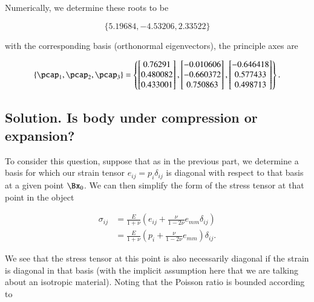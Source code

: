 Numerically, we determine these roots to be

\begin{equation}\label{eqn:continuumProblemSet1:310}
\{5.19684, -4.53206, 2.33522\}
\end{equation}

with the corresponding basis (orthonormal eigenvectors), the principle axes are

\begin{equation}\label{eqn:continuumProblemSet1:330}
\left\{
\pcap_1,
\pcap_2,
\pcap_3
\right\}
=
\left\{
\begin{bmatrix}
0.76291 \\
0.480082 \\
0.433001
\end{bmatrix},
\begin{bmatrix}
-0.010606 \\
-0.660372 \\
0.750863
\end{bmatrix},
\begin{bmatrix}
-0.646418 \\
0.577433 \\
0.498713
\end{bmatrix}
\right\}.
\end{equation}

\subsection{Solution.  Is body under compression or expansion?}

To consider this question, suppose that as in the previous part, we determine a basis for which our strain tensor $e_{ij} = p_i \delta_{ij}$ is diagonal with respect to that basis at a given point $\Bx_0$.  We can then simplify the form of the stress tensor at that point in the object

\begin{align*}
\sigma_{ij}
&=
\frac{E}{1 + \nu} \left(
e_{ij} + \frac{\nu}{1 - 2 \nu} e_{mm} \delta_{ij}
\right) \\
&=
\frac{E}{1 + \nu} \left(
p_i
 + \frac{\nu}{1 - 2 \nu} e_{mm}
\right)
\delta_{ij}.
\end{align*}

We see that the stress tensor at this point is also necessarily diagonal if the strain is diagonal in that basis (with the implicit assumption here that we are talking about an isotropic material).  Noting that the Poisson ratio is bounded according to

